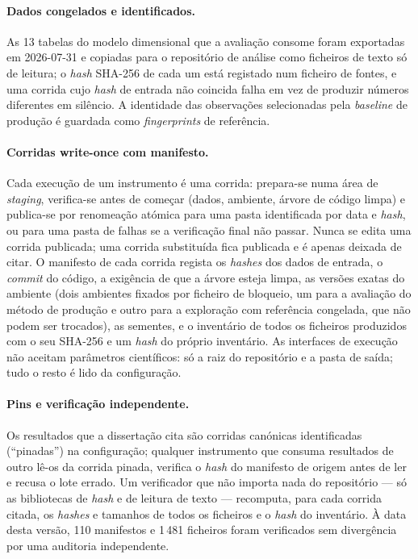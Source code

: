\paragraph{Dados congelados e identificados.} As 13 tabelas do modelo
dimensional que a avaliação consome foram exportadas em 2026-07-31 e
copiadas para o repositório de análise como ficheiros de texto só de
leitura; o \emph{hash} SHA-256 de cada um está registado num ficheiro de
fontes, e uma corrida cujo \emph{hash} de entrada não coincida falha em vez
de produzir números diferentes em silêncio. A identidade das observações
selecionadas pela \emph{baseline} de produção é guardada como
\emph{fingerprints} de referência.

\paragraph{Corridas write-once com manifesto.} Cada execução de um
instrumento é uma corrida: prepara-se numa área de \emph{staging},
verifica-se antes de começar (dados, ambiente, árvore de código limpa) e
publica-se por renomeação atómica para uma pasta identificada por data e
\emph{hash}, ou para uma pasta de falhas se a verificação final não
passar. Nunca se edita uma corrida publicada; uma corrida substituída
fica publicada e é apenas deixada de citar. O manifesto de cada corrida
regista os \emph{hashes} dos dados de entrada, o \emph{commit} do código, a
exigência de que a árvore esteja limpa, as versões exatas do ambiente
(dois ambientes fixados por ficheiro de bloqueio, um para a avaliação do
método de produção e outro para a exploração com referência congelada, que
não podem ser trocados), as sementes, e o inventário de todos os ficheiros
produzidos com o seu SHA-256 e um \emph{hash} do próprio inventário. As
interfaces de execução não aceitam parâmetros científicos: só a raiz do
repositório e a pasta de saída; tudo o resto é lido da configuração.

\paragraph{Pins e verificação independente.} Os resultados que a
dissertação cita são corridas canónicas identificadas (``pinadas'') na
configuração; qualquer instrumento que consuma resultados de outro lê-os
da corrida pinada, verifica o \emph{hash} do manifesto de origem antes de
ler e recusa o lote errado. Um verificador que não importa nada do
repositório --- só as bibliotecas de \emph{hash} e de leitura de texto ---
recomputa, para cada corrida citada, os \emph{hashes} e tamanhos de todos
os ficheiros e o \emph{hash} do inventário. À data desta versão, 110
manifestos e 1\,481 ficheiros foram verificados sem divergência por uma
auditoria independente.

